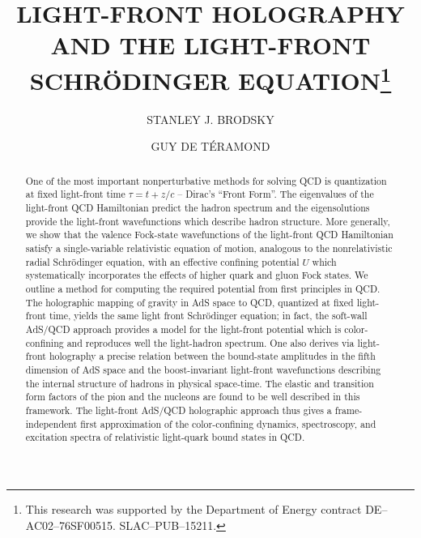 \documentclass[prd,aps,onecolumn,nofootinbib]{revtex4}
\begin{document}

\title{LIGHT-FRONT HOLOGRAPHY\\ AND THE LIGHT-FRONT SCHR\"ODINGER EQUATION\footnote{This research was supported by the Department of Energy  contract DE--AC02--76SF00515. SLAC--PUB--15211.}
}

\author{STANLEY J. BRODSKY}

\address{\it SLAC National Accelerator Laboratory, \\
 Stanford University\\
 Stanford, CA 94309, USA\\
\href{mailto:sjbth@slac.stanford.edu}{sjbth@slac.stanford.edu}}

\author{GUY DE T\'ERAMOND}

\address{\it Universidad de Costa Rica\\ San Jos\'e, Costa Rica\\
\href{mailto:gdt@asterix.crnet.cr}{gdt@asterix.crnet.cr}
}





\begin{abstract}
One of the most important nonperturbative methods for solving QCD is quantization at fixed light-front  time $\tau  = t+z/c$  -- Dirac's ``Front Form''.  
The eigenvalues of the light-front  QCD Hamiltonian predict the hadron spectrum and the eigensolutions provide the light-front wavefunctions which describe hadron structure. 
More generally, we show that the valence Fock-state wavefunctions 
of the light-front QCD Hamiltonian satisfy a single-variable relativistic equation of motion, analogous to the nonrelativistic radial Schr\"odinger equation, with an effective 
confining potential $U$ which systematically incorporates the effects of higher quark and gluon Fock states.   We outline a method for computing the required potential from first principles in QCD.
The holographic mapping of gravity in AdS space to QCD, quantized at fixed light-front time, yields the same light front Schr\"odinger equation;  in fact,  the soft-wall AdS/QCD approach  provides  a model for the light-front potential which is color-confining and reproduces well the light-hadron spectrum.  One also derives via light-front holography a precise relation between the bound-state amplitudes in the fifth dimension of AdS space and the boost-invariant light-front wavefunctions describing the internal structure of hadrons in physical space-time.   
The elastic and transition form factors of the pion and the nucleons are found to be well described in this framework.  
The light-front AdS/QCD  holographic approach thus gives  a frame-independent first approximation of the color-confining dynamics,  spectroscopy, and excitation spectra of relativistic light-quark bound states in QCD.    





\end{abstract}
\end{document}
